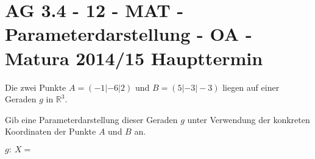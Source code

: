 \section{AG 3.4 - 12 - MAT - Parameterdarstellung - OA - Matura 2014/15 Haupttermin}

\begin{beispiel}[AG 3.4]{1} %
Die zwei Punkte $A = (-1| -6|2)$ und $B = (5| -3|-3)$ liegen auf einer Geraden $g$ in $\mathbb{R}^3$. \leer

Gib eine Parameterdarstellung dieser Geraden $g$ unter Verwendung der konkreten Koordinaten
der Punkte $A$ und $B$ an. \leer

$g:~X=$ 
\end{beispiel}